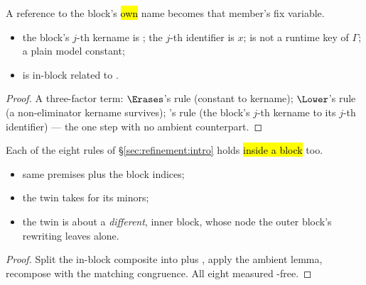 \begin{lemma}
\label{lem:ErasesLBFix-fixvar}
\leanok
{}
 A reference to the block's \hl{own} name becomes that member's fix variable.
\begin{itemize}
\item {} the block's $j$-th kername is ; the $j$-th identifier is $x$;
 is not a runtime key of $\Gamma$;  a plain model constant;
\item {}  is in-block related to .
\end{itemize}
\end{lemma}
\begin{proof}
\leanok
{}
 A three-factor term: $\Erases$'s  rule (constant to kername); $\Lower$'s
 rule (a non-eliminator kername survives); 's  rule (the block's
$j$-th kername to its $j$-th identifier) --- the one step with no ambient  counterpart.
\end{proof}

\begin{lemma}
\label{lem:ErasesLBFix-box}
\leanok
{}
 Each of the eight rules of \S\ref{sec:refinement:intro} holds \hl{inside a block} too.
\begin{itemize}
\item same premises plus the block indices;
\item the  twin takes  for its minors;
\item the  twin is about a \emph{different}, inner block, whose  node the outer
block's rewriting leaves alone.
\end{itemize}
\end{lemma}
\begin{proof}
\leanok
{}
 Split the in-block composite into  plus , apply the ambient
lemma, recompose with the matching congruence. All eight measured -free.
\end{proof}

